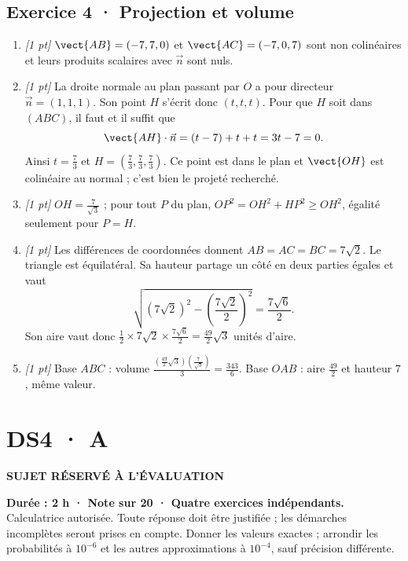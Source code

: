\subsection*{Exercice 4 · Projection et volume}\begin{enumerate}

\item \textit{[1 pt]} $\vect{AB}=(-7,7,0)$ et $\vect{AC}=(-7,0,7)$ sont non colinéaires et leurs produits scalaires avec $\vec n$ sont nuls.

\item \textit{[1 pt]} La droite normale au plan passant par $O$ a pour directeur $\vec n=(1,1,1)$. Son point $H$ s'écrit donc $(t,t,t)$. Pour que $H$ soit dans $(ABC)$, il faut et il suffit que
\[\vect{AH}\cdot\vec n=(t-7)+t+t=3t-7=0.\]
Ainsi $t=\frac{7}{3}$ et $H=(\frac{7}{3},\frac{7}{3},\frac{7}{3})$. Ce point est dans le plan et $\vect{OH}$ est colinéaire au normal ; c'est bien le projeté recherché.

\item \textit{[1 pt]} $OH=\frac{7}{\sqrt{3}}$ ; pour tout $P$ du plan, $OP^2=OH^2+HP^2\ge OH^2$, égalité seulement pour $P=H$.

\item \textit{[1 pt]} Les différences de coordonnées donnent $AB=AC=BC=7\sqrt2$. Le triangle est équilatéral. Sa hauteur partage un côté en deux parties égales et vaut
\[\sqrt{(7\sqrt2)^2-(\frac{7\sqrt{2}}{2})^2}=\frac{7\sqrt6}{2}.\]
Son aire vaut donc $\frac12\times 7\sqrt2\times\frac{7\sqrt6}{2}=\frac{49}{2}\sqrt3$ unités d'aire.

\item \textit{[1 pt]} Base $ABC$ : volume $\frac{(\frac{49}{2}\sqrt3)(\frac{7}{\sqrt{3}})}{3}=\frac{343}{6}$. Base $OAB$ : aire $\frac{49}{2}$ et hauteur $7$, même valeur.

\end{enumerate}

\fi

\ifprof

\clearpage{}\label{sujet:6-3}

\section*{DS4 · A}

{\sffamily\bfseries\color{amber}SUJET RÉSERVÉ À L'ÉVALUATION\par}

\textbf{Durée : 2 h · Note sur 20 · Quatre exercices indépendants.}\\Calculatrice autorisée. Toute réponse doit être justifiée ; les démarches incomplètes seront prises en compte. Donner les valeurs exactes ; arrondir les probabilités à $10^{-6}$ et les autres approximations à $10^{-4}$, sauf précision différente.

